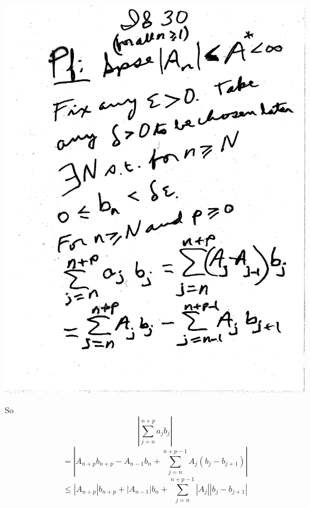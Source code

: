 \documentclass[10pt,a4paper]{article}
\begin{document}
\includegraphics[scale=.5]{Pages/IS_30}

\newpage

\noindent So
$$|\sum_{j=n}^{n+p} a_j b_j|$$
$$ = |A_{n+p} b_{n+p} - A_{n-1} b_n + \sum_{j=n}^{n+p-1} A_j(b_j - b_{j+1})|$$
$$ \leq |A_{n+p}| b_{n+p} + |A_{n-1}| b_n + \sum_{j=n}^{n+p-1} |A_j| |b_j - b_{j+1}|$$
\end{document}
